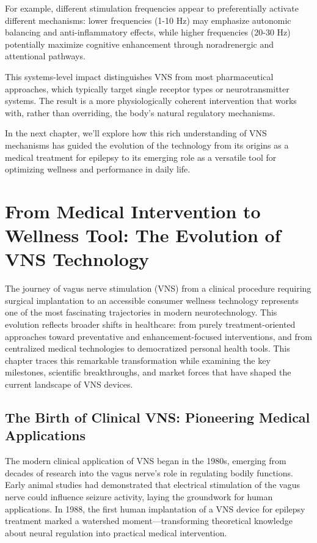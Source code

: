 \documentclass[
  Letterpaper,
]{scrbook}
\begin{document}
For example, different stimulation frequencies appear to preferentially
activate different mechanisms: lower frequencies (1-10 Hz) may emphasize
autonomic balancing and anti-inflammatory effects, while higher
frequencies (20-30 Hz) potentially maximize cognitive enhancement
through noradrenergic and attentional pathways.

This systems-level impact distinguishes VNS from most pharmaceutical
approaches, which typically target single receptor types or
neurotransmitter systems. The result is a more physiologically coherent
intervention that works with, rather than overriding, the body's natural
regulatory mechanisms.

In the next chapter, we'll explore how this rich understanding of VNS
mechanisms has guided the evolution of the technology from its origins
as a medical treatment for epilepsy to its emerging role as a versatile
tool for optimizing wellness and performance in daily life.


\chapter{From Medical Intervention to Wellness Tool: The Evolution of
VNS
Technology}\label{from-medical-intervention-to-wellness-tool-the-evolution-of-vns-technology}

The journey of vagus nerve stimulation (VNS) from a clinical procedure
requiring surgical implantation to an accessible consumer wellness
technology represents one of the most fascinating trajectories in modern
neurotechnology. This evolution reflects broader shifts in healthcare:
from purely treatment-oriented approaches toward preventative and
enhancement-focused interventions, and from centralized medical
technologies to democratized personal health tools. This chapter traces
this remarkable transformation while examining the key milestones,
scientific breakthroughs, and market forces that have shaped the current
landscape of VNS devices.

\section{The Birth of Clinical VNS: Pioneering Medical
Applications}\label{the-birth-of-clinical-vns-pioneering-medical-applications}

The modern clinical application of VNS began in the 1980s, emerging from
decades of research into the vagus nerve's role in regulating bodily
functions. Early animal studies had demonstrated that electrical
stimulation of the vagus nerve could influence seizure activity, laying
the groundwork for human applications. In 1988, the first human
implantation of a VNS device for epilepsy treatment marked a watershed
moment---transforming theoretical knowledge about neural regulation into
practical medical intervention.
\end{document}
